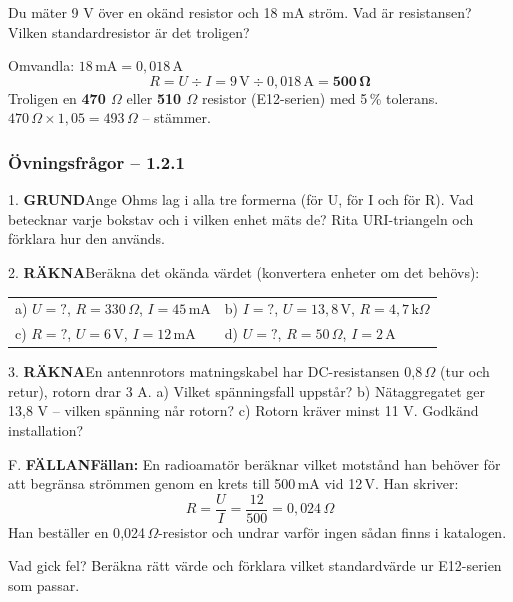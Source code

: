 \documentclass[a4paper,11pt,twoside]{book}
\newcommand{\qgrund}{\colorbox{greenpale}{\textcolor{greendark}{\headingfont\bfseries\tiny GRUND}}}
\newcommand{\qrakna}{\colorbox{bluepale}{\textcolor{bluedark}{\headingfont\bfseries\tiny RÄKNA}}}
\newcommand{\qfallan}{\colorbox{ljusbrun}{\textcolor{kakao}{\headingfont\bfseries\tiny FÄLLAN}}}
\begin{document}
\begin{worked}[title={Räkneexempel 1.2.1-3 – Felsökning med multimeter}]
Du mäter 9 V över en okänd resistor och 18 mA ström. Vad är resistansen? Vilken standardresistor är det troligen?

Omvandla: $18\,\text{mA} = 0{,}018\,\text{A}$
\[ R = U \div I = 9\,\text{V} \div 0{,}018\,\text{A} = \mathbf{500\,\Omega} \]
Troligen en \textbf{470 $\Omega$} eller \textbf{510 $\Omega$} resistor (E12-serien) med 5\,\% tolerans. $470\,\Omega \times 1{,}05 = 493\,\Omega$ – stämmer.
\end{worked}

\subsubsection*{Övningsfrågor – 1.2.1}

\begin{qblock}{1.}
\qgrund\quad Ange Ohms lag i alla tre formerna (för U, för I och för R). Vad betecknar varje bokstav och i vilken enhet mäts de? Rita URI-triangeln och förklara hur den används.
\end{qblock}

\begin{qblock}{2.}
\qrakna\quad Beräkna det okända värdet (konvertera enheter om det behövs):
\begin{center}
\begin{tabular}{ll}
a) $U = ?$, $R = 330\,\Omega$, $I = 45\,\text{mA}$ &
b) $I = ?$, $U = 13{,}8\,\text{V}$, $R = 4{,}7\,\text{k}\Omega$ \\[4pt]
c) $R = ?$, $U = 6\,\text{V}$, $I = 12\,\text{mA}$ &
d) $U = ?$, $R = 50\,\Omega$, $I = 2\,\text{A}$
\end{tabular}
\end{center}
\end{qblock}

\begin{qblock}{3.}
\qrakna\quad En antennrotors matningskabel har DC-resistansen 0,8\,$\Omega$ (tur och retur), rotorn drar 3 A. a) Vilket spänningsfall uppstår? b) Nätaggregatet ger 13,8 V – vilken spänning når rotorn? c) Rotorn kräver minst 11 V. Godkänd installation?
\end{qblock}

\begin{qblock}{F.}
\qfallan\quad \textbf{Fällan:} En radioamatör beräknar vilket 
motstånd han behöver för att begränsa strömmen genom en krets 
till 500\,mA vid 12\,V. Han skriver:
\[
R = \frac{U}{I} = \frac{12}{500} = 0{,}024\,\Omega
\]
Han beställer en 0{,}024\,$\Omega$-resistor och undrar varför 
ingen sådan finns i katalogen.

Vad gick fel? Beräkna rätt värde och förklara vilket 
standardvärde ur E12-serien som passar.
\end{qblock}
\end{document}
